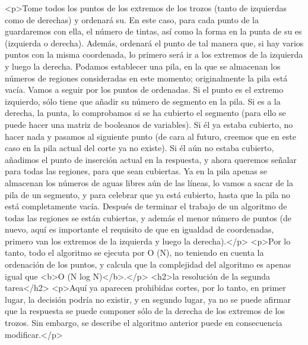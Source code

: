 <p>Tome todos los puntos de los extremos de los trozos (tanto de izquierdas como de derechas) y ordenará su. En este caso, para cada punto de la guardaremos con ella, el número de tintas, así como la forma en la punta de su es (izquierda o derecha). Además, ordenará el punto de tal manera que, si hay varios puntos con la misma coordenada, lo primero será ir a los extremos de la izquierda y luego la derecha. Podamos establecer una pila, en la que se almacenan los números de regiones consideradas en este momento; originalmente la pila está vacía. Vamos a seguir por los puntos de ordenadas. Si el punto es el extremo izquierdo, sólo tiene que añadir su número de segmento en la pila. Si es a la derecha, la punta, lo comprobamos si se ha cubierto el segmento (para ello se puede hacer una matriz de booleanos de variables). Si él ya estaba cubierto, no hacer nada y pasamos al siguiente punto (de cara al futuro, creemos que en este caso en la pila actual del corte ya no existe). Si él aún no estaba cubierto, añadimos el punto de inserción actual en la respuesta, y ahora queremos señalar para todas las regiones, para que sean cubiertas. Ya en la pila apenas se almacenan los números de aguas libres aún de las líneas, lo vamos a sacar de la pila de un segmento, y para celebrar que ya está cubierto, hasta que la pila no está completamente vacía. Después de terminar el trabajo de un algoritmo de todas las regiones se están cubiertas, y además el menor número de puntos (de nuevo, aquí es importante el requisito de que en igualdad de coordenadas, primero van los extremos de la izquierda y luego la derecha).</p>
<p>Por lo tanto, todo el algoritmo se ejecuta por O (N), no teniendo en cuenta la ordenación de los puntos, y calcula que la complejidad del algoritmo es apenas igual que <b>O (N log N)</b>.</p>
<h2>la resolución de la segunda tarea</h2>
<p>Aquí ya aparecen prohibidas cortes, por lo tanto, en primer lugar, la decisión podría no existir, y en segundo lugar, ya no se puede afirmar que la respuesta se puede componer sólo de la derecha de los extremos de los trozos. Sin embargo, se describe el algoritmo anterior puede en consecuencia modificar.</p>
